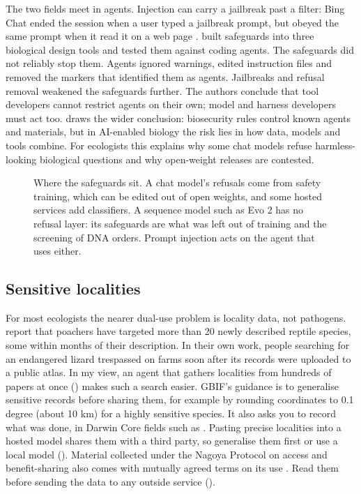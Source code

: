 The two fields meet in agents. Injection can carry a jailbreak past a filter:
Bing Chat ended the session when a user typed a jailbreak prompt, but obeyed
the same prompt when it read it on a web page \parencite{greshake2023injection}.
\textcite{barkan2026restricting} built safeguards into three biological design
tools and tested them against coding agents. The safeguards did not reliably
stop them. Agents ignored warnings, edited instruction files and removed the
markers that identified them as agents. Jailbreaks and refusal removal
weakened the safeguards further. The authors conclude that tool developers
cannot restrict agents on their own; model and harness developers must act
too. \textcite{holko2026relationalbiosecurity} draws the wider conclusion:
biosecurity rules control known agents and materials, but in AI-enabled
biology the risk lies in how data, models and tools combine. For ecologists
this explains why some chat models refuse harmless-looking biological
questions and why open-weight releases are contested.

\begin{figure}[htbp]
\centering
{}
\caption{Where the safeguards sit. A chat model's refusals come from safety
training, which can be edited out of open weights, and some hosted services
add classifiers. A sequence model such as Evo 2 has no refusal layer: its
safeguards are what was left out of training and the screening of DNA orders.
Prompt injection acts on the agent that uses either.}
\label{fig:sharedlayer}
\end{figure}

\subsection{Sensitive localities}

For most ecologists the nearer dual-use problem is locality data, not
pathogens. \textcite{lindenmayer2017donotpublish} report that poachers have
targeted more than 20 newly described reptile species, some within months of
their description. In their own work, people searching for an endangered
lizard trespassed on farms soon after its records were uploaded to a public
atlas. In my view, an agent that gathers localities from hundreds of papers
at once () makes such a search easier.
GBIF's guidance is to generalise sensitive records before sharing them, for
example by rounding coordinates to 0.1 degree (about 10 km) for a highly
sensitive species. It also asks you to record what was done, in Darwin Core
fields such as  \parencite{chapman2020sensitive}.
Pasting precise localities into a hosted model shares them with a third party,
so generalise them first or use a local model ().
Material collected under the Nagoya Protocol on access and benefit-sharing
also comes with mutually agreed terms on its use \parencite{scholz2022dsi}. Read them before sending the data
to any outside service ().

